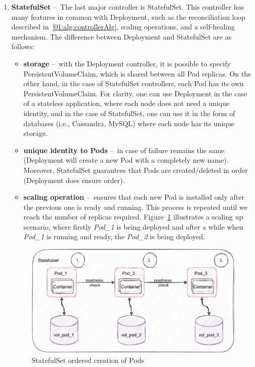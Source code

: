 \begin{enumerate}
    \item \textbf{StatefulSet} \---\ The last major controller is StatefulSet.
    This controller has many features in common with Deployment, such as the reconciliation loop described in~\ref{01:alg:controllerAlg}, scaling operations, and a self-healing mechanism.
    The difference between Deployment and StatefulSet are as follows:
    \begin{itemize}
        \item \textbf{storage} \---\ with the Deployment controller, it is possible to specify PersistentVolumeClaim, which is shared between all Pod replicas.
        On the other hand, in the case of StatefulSet controllers, each Pod has its own PersistentVolumeClaim.
        For clarity, one can use Deployment in the case of a stateless application, where each node does not need a unique identity, and in the case of StatefulSet, one can use it in the form of databases (i.e., Cassandra, MySQL) where each node has its unique storage.
        \item \textbf{unique identity to Pods} \---\ in case of failure remains the same (Deployment will create a new Pod with a completely new name).
        Moreover, StatefulSet guarantees that Pods are created/deleted in order (Deployment does ensure order).
        \item \textbf{scaling operation} \---\  ensures that each new Pod is installed only after the previous one is ready and running.
        This process is repeated until we reach the number of replicas required.
        Figure~\ref{02:fig:statefulsetOrderedCreation} illustrates a scaling up scenario, where firstly \emph{Pod\_1} is being deployed and after a while when \emph{Pod\_1} is running and ready, the \emph{Pod\_2} is being deployed.
    \end{itemize}

    \begin{figure}[!h]
        \centering
        \includegraphics[scale=1]{obrazky-figures/02-preliminaries/01-kubernetes/04-statefuset_with_volume}
        \caption{StatefulSet ordered creation of Pods}
        \label{02:fig:statefulsetOrderedCreation}
    \end{figure}


\end{enumerate}
